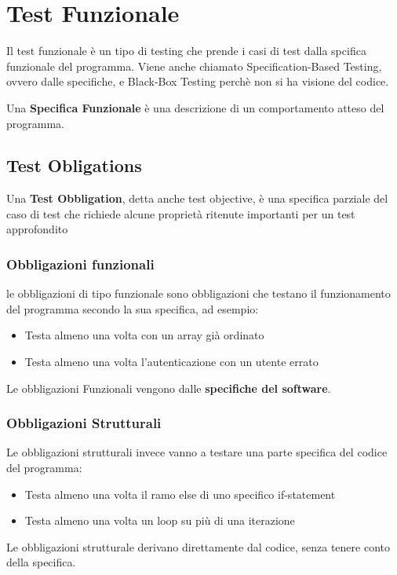 \chapter{Test Funzionale}
Il test funzionale è un tipo di testing che prende i casi di test dalla spcifica funzionale del programma.
Viene anche chiamato Specification-Based Testing, ovvero dalle specifiche, e Black-Box Testing perchè non si ha visione del codice.

Una \textbf{Specifica Funzionale} è una descrizione di un comportamento atteso del programma.

\section{Test Obligations}
Una \textbf{Test Obbligation}, detta anche test objective, è una specifica parziale del caso di test che richiede alcune proprietà ritenute importanti per un test approfondito

\subsection{Obbligazioni funzionali} le obbligazioni di tipo funzionale sono obbligazioni che testano 
il funzionamento del programma secondo la sua specifica, ad esempio:
\begin{itemize}
    \item Testa almeno una volta con un array già ordinato
    \item Testa almeno una volta l'autenticazione con un utente errato
\end{itemize}
Le obbligazioni Funzionali vengono dalle \textbf{specifiche del software}.

\subsection{Obbligazioni Strutturali}
Le obbligazioni strutturali invece vanno a testare una parte specifica del codice del programma:

\begin{itemize}
    \item Testa almeno una volta il ramo else di uno specifico if-statement
    \item Testa almeno una volta un loop su più di una iterazione
\end{itemize}
Le obbligazioni strutturale derivano direttamente dal codice, senza tenere conto della specifica.


